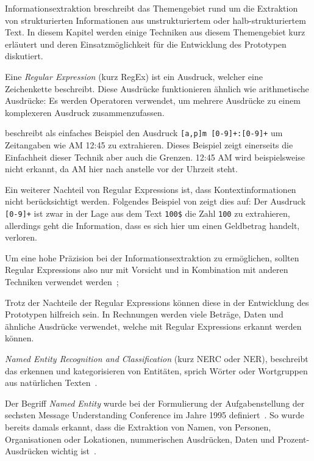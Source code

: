 \documentclass{hwz}
\begin{document}

Informationsextraktion breschreibt das Themengebiet rund um die Extraktion von strukturierten Informationen aus unstrukturiertem oder halb-strukturiertem Text. In diesem Kapitel werden einige Techniken aus diesem Themengebiet kurz erläutert und deren Ein\-satz\-mög\-lich\-keit für die Entwicklung des Prototypen diskutiert.

Eine \textit{Regular Expression} (kurz RegEx) ist ein Ausdruck, welcher eine Zeichenkette beschreibt. Diese Ausdrücke funktionieren ähnlich wie arithmetische Ausdrücke: Es werden Operatoren verwendet, um mehrere Ausdrücke zu einem komplexeren Ausdruck zusammenzufassen\autocite{Xiao2004InformationApplications}.

\textcite{Xiao2004InformationApplications} beschreibt als einfaches Beispiel den Ausdruck \texttt{[a,p]m [0-9]+:[0-9]+} um Zeitangaben wie AM 12:45 zu extrahieren. Dieses Beispiel zeigt einerseits die Einfachheit dieser Technik aber auch die Grenzen. 12:45 AM wird beispielsweise nicht erkannt, da AM hier nach anstelle vor der Uhrzeit steht. 

Ein weiterer Nachteil von Regular Expressions ist, dass Kontextinformationen nicht be\-rück\-sich\-tigt werden. Folgendes Beispiel von \textcite{Xiao2004InformationApplications} zeigt dies auf: Der Ausdruck \texttt{[0-9]+} ist zwar in der Lage aus dem Text \texttt{100\$} die Zahl \texttt{100} zu extrahieren, allerdings geht die Information, dass es sich hier um einen Geldbetrag handelt, verloren.

Um eine hohe Präzision bei der Informationsextraktion zu ermöglichen, sollten Regular Expressions also nur mit Vorsicht und in Kombination mit anderen Techniken verwendet werden~\autocite{Xiao2004InformationApplications};

Trotz der Nachteile der Regular Expressions können diese in der Entwicklung des Prototypen hilfreich sein. In Rechnungen werden viele Beträge, Daten und ähnliche Ausdrücke verwendet, welche mit Regular Expressions erkannt werden können.

\textit{Named Entity Recognition and Classification} (kurz NERC oder NER), beschreibt das erkennen und kategorisieren von Entitäten, sprich Wörter oder Wortgruppen aus natürlichen Texten~\autocite{Nadeau2007AClassification}.

Der Begriff \textit{Named Entity} wurde bei der Formulierung der Aufgabenstellung der sechsten Message Understanding Conference im Jahre 1995 definiert~\autocite{Borthwick1998NYU:MUC-7}. So wurde bereits damals erkannt, dass die Extraktion von Namen, von Personen, Organisationen oder Lokationen, nummerischen Ausdrücken, Daten und Prozent-Ausdrücken wichtig ist~\autocite{Nadeau2007AClassification}.
\end{document}
